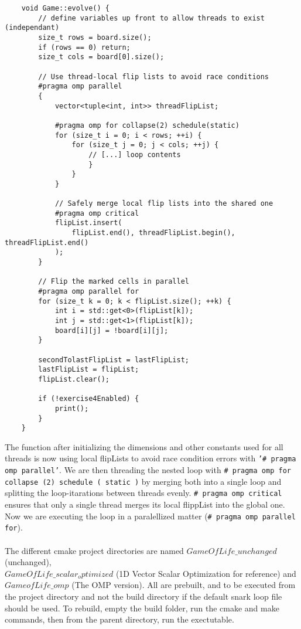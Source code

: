 \documentclass[a4paper]{article}
\begin{document}
\begin{lstlisting}
    void Game::evolve() {
        // define variables up front to allow threads to exist (independant)
        size_t rows = board.size();
        if (rows == 0) return;
        size_t cols = board[0].size();

        // Use thread-local flip lists to avoid race conditions
        #pragma omp parallel
        {
            vector<tuple<int, int>> threadFlipList;

            #pragma omp for collapse(2) schedule(static)
            for (size_t i = 0; i < rows; ++i) {
                for (size_t j = 0; j < cols; ++j) {
                    // [...] loop contents
                    }
                }
            }

            // Safely merge local flip lists into the shared one
            #pragma omp critical
            flipList.insert(
                flipList.end(), threadFlipList.begin(), threadFlipList.end()
            );
        }

        // Flip the marked cells in parallel
        #pragma omp parallel for
        for (size_t k = 0; k < flipList.size(); ++k) {
            int i = std::get<0>(flipList[k]);
            int j = std::get<1>(flipList[k]);
            board[i][j] = !board[i][j];
        }

        secondTolastFlipList = lastFlipList;
        lastFlipList = flipList;
        flipList.clear();

        if (!exercise4Enabled) {
            print();
        }
    }
\end{lstlisting}
The function after initializing the dimensions and other constants used for all threads is now using local flipLists to avoid race condition errors with \texttt{'\# pragma omp parallel'}. We are then threading the nested loop with \texttt{\# pragma omp for collapse (2) schedule ( static )} by merging both into a single loop and splitting the loop-itarations between threads evenly. \texttt{\# pragma omp critical} ensures that only a single thread merges its local flippList into the global one. Now we are executing the loop in a paralellized matter (\texttt{\# pragma omp parallel for}).\\\\
The different cmake project directories are named $GameOfLife\_unchanged$ (unchanged),\\ $GameOfLife\_scalar_optimized$ (1D Vector Scalar Optimization for reference) and $GameofLife\_omp$ (The OMP version). All are prebuilt, and to be executed from the project directory and not the build directory if the default snark loop file should be used. To rebuild, empty the build folder, run the cmake and make commands, then from the parent directory, run the exectutable.
\end{document}
